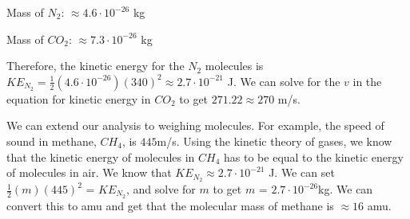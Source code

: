 \documentclass[11pt,twoside]{article}
\begin{document}
Mass of $N_2$: $\approx 4.6 \cdot 10^{-26}$ kg

Mass of $CO_2$: $\approx 7.3 \cdot 10^{-26}$ kg 

Therefore, the kinetic energy for the $N_2$ molecules is $KE_{N_2} = \frac{1}{2}(4.6 \cdot 10^{-26})(340)^2 \approx 2.7 \cdot 10^{-21}$ J. We can solve for the $v$ in the equation for kinetic energy in $CO_2$ to get $271.22 \approx 270$ m/s.

We can extend our analysis to weighing molecules. For example, the speed of sound in methane, $CH_4$, is $445$m/s. Using the kinetic theory of gases, we know that the kinetic energy of molecules in $CH_4$ has to be equal to the kinetic energy of molecules in air. We know that $KE_{N_2} \approx 2.7 \cdot 10^{-21}$ J. We can set $\frac{1}{2}(m)(445)^2$ = $KE_{N_2}$, and solve for $m$ to get $m$ = $2.7 \cdot 10^{-26}$kg. We can convert this to amu and get that the molecular mass of methane is $\approx 16$ amu.
\end{document}
